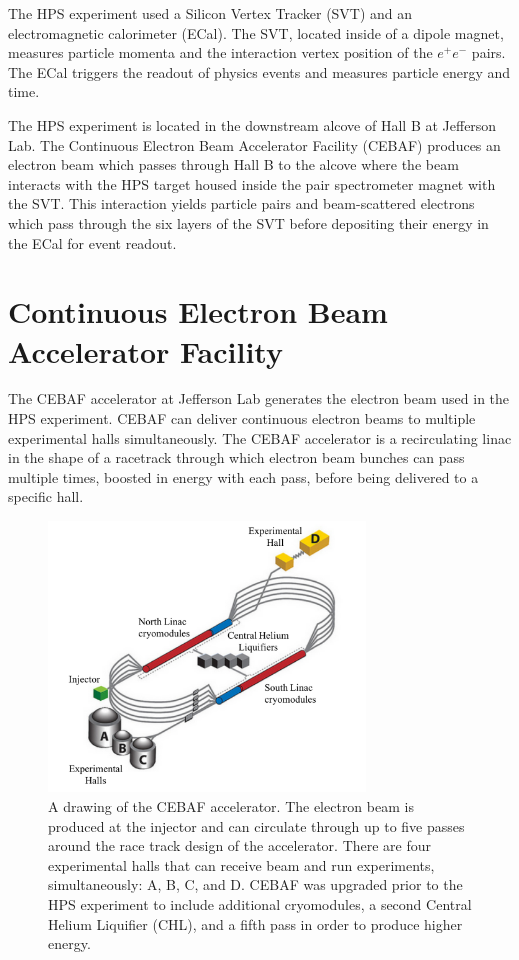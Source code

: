 The HPS experiment used a Silicon Vertex Tracker (SVT) and an electromagnetic calorimeter (ECal). The SVT, located inside of a dipole magnet, measures particle momenta and the interaction vertex position of the $e^+e^-$ pairs. The ECal triggers the readout of physics events and measures particle energy and time. \par
The HPS experiment is located in the downstream alcove of Hall B at Jefferson Lab. The Continuous Electron Beam Accelerator Facility (CEBAF) produces an electron beam which passes through Hall B to the alcove where the beam interacts with the HPS target housed inside the pair spectrometer magnet with the SVT. This interaction yields particle pairs and beam-scattered electrons which pass through the six layers of the SVT before depositing their energy in the ECal for event readout.

\section{Continuous Electron Beam Accelerator Facility}

The CEBAF accelerator at Jefferson Lab generates the electron beam used in the HPS experiment. CEBAF can deliver continuous electron beams to multiple experimental halls simultaneously. The CEBAF accelerator is a recirculating linac in the shape of a racetrack through which electron beam bunches can pass multiple times, boosted in energy with each pass, before being delivered to a specific hall. 

\begin{figure}[htb]
  \centering
      \includegraphics[width=0.75\textwidth]{pics/experiment/cebafLabel.png}
  \caption[CEBAF accelerator]{A drawing of the CEBAF accelerator. The electron beam is produced at the injector and can circulate through up to five passes around the race track design of the accelerator. There are four experimental halls that can receive beam and run experiments, simultaneously: A, B, C, and D. CEBAF was upgraded prior to the HPS experiment to include additional cryomodules, a second Central Helium Liquifier (CHL), and a fifth pass in order to produce higher energy.}
  \label{Figure:cebaf}
\end{figure}

